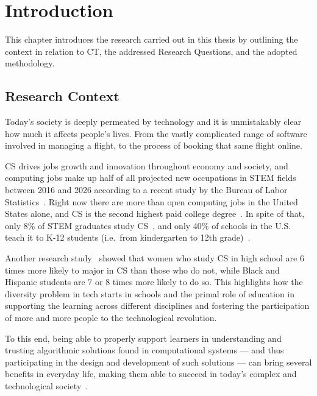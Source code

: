 %
\chapter{Introduction}\label{chap:intro}


This chapter introduces the research carried out in this thesis by outlining the context in relation to \ac{CT}, the addressed Research Questions, and the adopted methodology.

\section{Research Context}
Today's society is deeply permeated by technology and it is unmistakably clear how much it affects people's lives. From the vastly complicated range of software involved in managing a flight, to the process of booking that same flight online.

\ac{CS} drives jobs growth and innovation throughout economy and society, and computing jobs make up half of all projected new occupations in \ac{STEM} fields between 2016 and 2026 according to a recent study by the Bureau of Labor Statistics~\cite{BLSEP2016}. Right now there are more than  open computing jobs in the United States alone, and \ac{CS} is the second highest paid college degree~\cite{NACE2018}. In spite of that, only 8\% of \ac{STEM} graduates study \ac{CS}~\cite{IPEDS2016}, and only 40\% of schools in the U.S. teach it to K-12 students (i.e.\ from kindergarten to 12th grade)~\cite{Gallup2016}.

Another research study~\cite{morgan2007ap} showed that women who study \ac{CS} in high school are 6 times more likely to major in \ac{CS} than those who do not, while Black and Hispanic students are 7 or 8 times more likely to do so. This highlights how the diversity problem in tech starts in schools and the primal role of education in supporting the learning across different disciplines and fostering the participation of more and more people to the technological revolution.

To this end, being able to properly support learners in understanding and trusting algorithmic solutions found in computational systems --- and thus participating in the design and development of such solutions --- can bring several benefits in everyday life, making them able to succeed in today's complex and technological society~\cite{Bundy:2007}.

